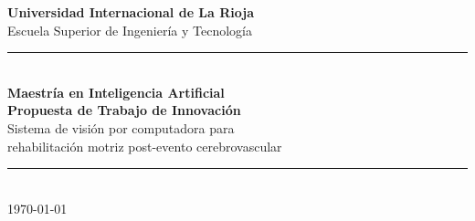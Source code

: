 \begin{titlepage}
\thispagestyle{empty}
\centering
\vspace*{1.8cm}

{\normalsize\textbf{Universidad Internacional de La Rioja}}\\[0.4cm]
{\small Escuela Superior de Ingeniería y Tecnología}\\[2.2cm]

\rule{\textwidth}{0.5pt}\\[0.8cm]

{\Large\textbf{Maestría en Inteligencia Artificial}}\\[1.2cm]

{\Large\textbf{Propuesta de Trabajo de Innovación}}\\[0.6cm]

{\large Sistema de visión por computadora para\\[0.3cm]
rehabilitación motriz post-evento cerebrovascular}\\[1.5cm]

\rule{\textwidth}{0.5pt}\\[2cm]

\vfill
{\small \today}
\end{titlepage}
\newpage
